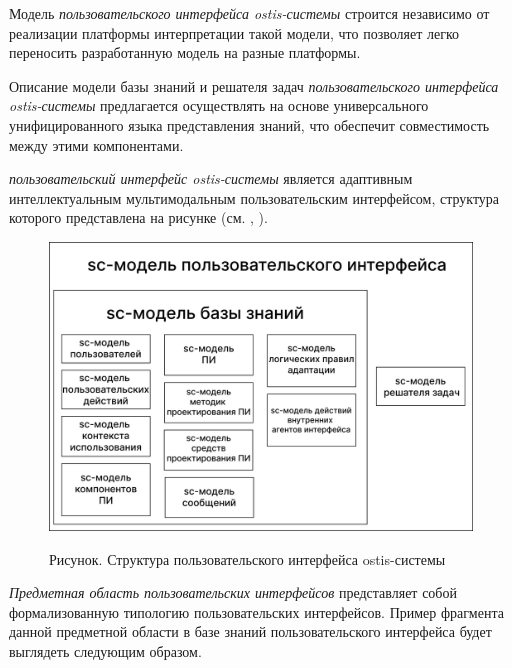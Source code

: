 \begin{textitemize}
	\item Модель \textit{пользовательского интерфейса ostis-системы} строится независимо от реализации платформы интерпретации такой модели, что позволяет легко переносить разработанную модель на разные платформы.
	\item Описание модели базы знаний и решателя задач \textit{пользовательского интерфейса ostis-системы} предлагается осуществлять на основе универсального унифицированного языка представления знаний, что обеспечит совместимость между этими компонентами.
\end{textitemize}

\textit{пользовательский интерфейс ostis-системы} является адаптивным интеллектуальным мультимодальным пользовательским интерфейсом, структура которого представлена на рисунке \textit{} (см. , ).

\begin{figure}[H]
	\caption{Рисунок. Структура пользовательского интерфейса ostis-системы}
	\includegraphics[scale=0.3]{author/part4/figures/ui_model.png}
	\label{fig:ostis_ui_structure}
\end{figure}

\textit{Предметная область пользовательских интерфейсов} представляет собой формализованную типологию пользовательских интерфейсов. Пример фрагмента данной предметной области в базе знаний пользовательского интерфейса будет выглядеть следующим образом.

